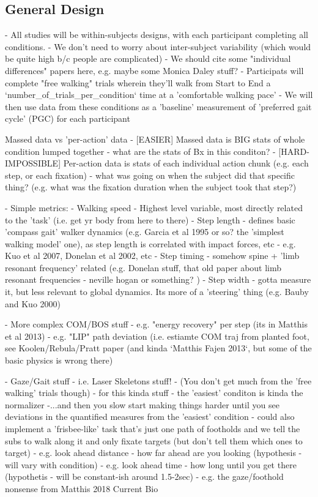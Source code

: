 \subsection{General Design}
- All studies will be within-subjects designs, with each participant completing all conditions.    
    - We don't need to worry about inter-subject variability (which would be quite high b/c people are complicated)
        - We should cite some "individual differences" papers here, e.g. maybe some Monica Daley stuff?
- Participats will complete "free walking" trials wherein they'll walk from Start to End a `number_of_trials_per_condition` time at a 'comfortable walking pace'
    - We will then use data from these conditions as a 'baseline' measurement of 'preferred gait cycle' (PGC) for each participant


Massed data vs 'per-action' data
 - [EASIER] Massed data is BIG stats of whole condition lumped together
    - what are the stats of Bx in this conditon?
 - [HARD-IMPOSSIBLE] Per-action data is stats of each individual action chunk (e.g. each step, or each fixation)
    - what was going on when the subject did that specific thing? (e.g. what was the fixation duration when the subject took that step?)

- Simple metrics:
    - Walking speed
        - Highest level variable, most directly related to the 'task' (i.e. get yr body from here to there)
    - Step length
        - defines basic 'compass gait' walker dynamics (e.g. Garcia et al 1995 or so? the 'simplest walking model' one), as step length is correlated with impact forces, etc
            - e.g. Kuo et al 2007, Donelan et al 2002, etc
    - Step timing 
        - somehow spine + 'limb resonant frequency' related (e.g. Donelan stuff, that old paper about limb resonant frequencies - neville hogan or something? )
    - Step width
        - gotta measure it, but less relevant to global dynamics. Its more of a 'steering' thing (e.g. Bauby and Kuo 2000)


- More complex COM/BOS stuff
    - e.g. "energy recovery" per step (its in Matthis et al 2013)
    - e.g. "LIP" path deviation (i.e. estiamte COM traj from planted foot, see Koolen/Rebula/Pratt paper (and kinda `Matthis Fajen 2013`, but some of the basic physics is wrong there)


- Gaze/Gait stuff
    - i.e. Laser Skeletons stuff! 
        - (You don't get much from the 'free walking' trials though)
        - for this kinda stuff - the 'easiest' conditon is kinda the normalizer
            -...and then you slow start making things harder until you see deviations in the quantified measures from the 'easiest' condition
        - could also implement a 'frisbee-like' task that's just one path of footholds and we tell the subs to walk along it and only fixate targets (but don't tell them which ones to target)
    - e.g. look ahead distance - how far ahead are you looking (hypothesis - will vary with condition)
    - e.g. look ahead time - how long until you get there (hypothetis - will be constant-ish around 1.5-2sec)
    - e.g. the gaze/foothold nonsense from Matthis 2018 Current Bio



